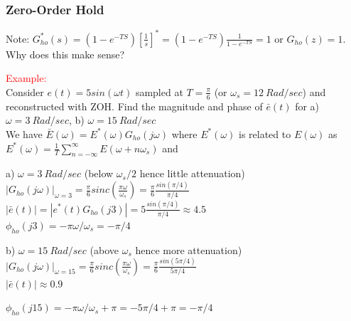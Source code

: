 \documentclass[mathserif, 10pt]{beamer} %
\begin{document}
\frame
{

\small


\frametitle{Zero-Order Hold}

Note: $G^*_{ho}(s)= (1-e^{-TS}) [\frac{1}{s}]^* = (1-e^{-TS}) \frac{1}{1-e^{-TS}}=1$ or $G_{ho}(z)=1$.  Why does this make sense? \\ \vspace{.06in}

\textcolor{red}{ Example:}\\

Consider $e(t) = 5sin(\omega t)$ sampled at $T= \frac{\pi}{6}$ (or $\omega_s=12~Rad/sec$)  and reconstructed with ZOH.  Find the magnitude and phase of $\bar e(t)$ for a) $\omega = 3~ Rad/sec$, b) $\omega=15~Rad/sec$\\ \vspace{.1in}
We have $\bar{E}(\omega)= E^*(\omega)G_{ho}(j\omega)$ where $E^*(\omega)$ is related to $E(\omega)$ as $E^*(\omega) = \frac{1}{T}\sum\limits_{n=-\infty}^{\infty} E(\omega +n \omega_s)$ and

a) $\omega = 3~ Rad/sec$ (below $\omega_s/2$ hence little attenuation) \\
$|G_{ho}(j\omega)|_{\omega = 3} = \frac{\pi}{6} sinc(\frac{\pi \omega}{\omega_s}) = \frac{\pi}{6}\frac{sin(\pi/4)}{\pi/4}$\\
$|\bar e(t)| = |e^*(t)G_{ho}(j3)|=5 \frac{sin(\pi/4)}{\pi/4} \approx 4.5 $ \\
$\phi_{ho}(j3) = -\pi \omega/\omega_s = -\pi/4$ \\ \vspace{.1in}

b) $\omega = 15~ Rad/sec$ (above $\omega_s$ hence more attenuation)\\
$|G_{ho}(j\omega)|_{\omega=15} = \frac{\pi}{6} sinc(\frac{\pi \omega}{\omega_s}) = \frac{\pi}{6} \frac{sin(5 \pi/4)}{5\pi/4}$\\
$|\bar e(t)|  \approx 0.9$

$\phi_{ho}(j15) = -\pi \omega/\omega_s +\pi = -5 \pi/4+\pi = -\pi/4$



}
\end{document}
